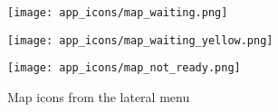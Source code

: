 \begin{appendices}
\begin{figure*}[h!t]
	\begin{multicols}{4}
		\hspace{\linewidth} 
	    \texttt{[image: app\_icons/map\_waiting.png]}\par 
	    \texttt{[image: app\_icons/map\_waiting\_yellow.png]}\par 
	    \hspace{\linewidth}
    \end{multicols}

    \texttt{[image: app\_icons/map\_not\_ready.png]}

	\caption{Map icons from the lateral menu}
\end{figure*}

\end{appendices}